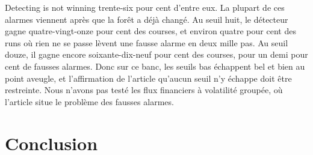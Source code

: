 \documentclass[aspectratio=169,11pt]{beamer}
\begin{document}
\begin{frame}{Detecting is not winning}
{    trente-six pour cent d'entre eux. La plupart de ces alarmes viennent après que la forêt a
    déjà changé. Au seuil huit, le détecteur gagne quatre-vingt-onze pour cent des courses,
    et environ quatre pour cent des runs où rien ne se passe lèvent une fausse alarme en deux
    mille pas. Au seuil douze, il gagne encore soixante-dix-neuf pour cent des courses, pour
    un demi pour cent de fausses alarmes. Donc sur ce banc, les seuils bas échappent bel et
    bien au point aveugle, et l'affirmation de l'article qu'aucun seuil n'y échappe doit
    être restreinte. Nous n'avons pas testé les flux financiers à volatilité groupée, où
    l'article situe le problème des fausses alarmes.}
\end{frame}

\section{Conclusion}
\end{document}
